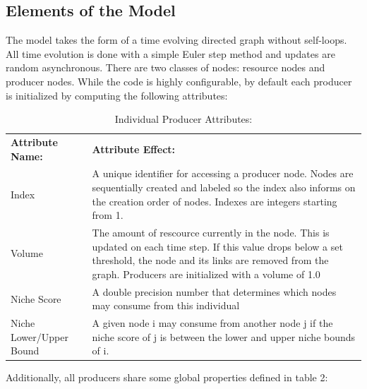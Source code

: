 \documentclass{paper}
\begin{document}
	\subsection{Elements of the Model}
	The model takes the form of a time evolving directed graph without self-loops. All time evolution is done with a simple Euler step method and updates are random asynchronous. There are two classes of nodes: resource nodes and producer nodes. While the code is highly configurable, by default each producer is initialized by computing the following attributes:
	
	\begin{table}[H]
		\begin{center}
		\caption {Individual Producer Attributes:} \label{tab:title} 
		\begin{tabular}{|p{}|p{}|}
			\cline{1-2}
			\textbf{Attribute Name:} & \textbf{Attribute Effect:}  \\ \cline{1-2}
			Index & A unique identifier for accessing a producer node. Nodes are sequentially created and labeled so the index also informs on the creation order of nodes. Indexes are integers starting from 1. \\ \cline{1-2}
			Volume & The amount of rescource currently in the node. This is updated on each time step. If this value drops below a set threshold, the node and its links are removed from the graph. Producers are initialized with a volume of 1.0  \\ \cline{1-2}
			Niche Score & A double precision number that determines which nodes may consume from this individual \\ \cline{1-2}
			Niche Lower/Upper Bound & A given node i may consume from another node j if the niche score of j is between the lower and upper niche bounds of i.\\ \cline{1-2}
			\cline{1-2}
		\end{tabular}
		\end{center}
	\end{table}

	Additionally, all producers share some global properties defined in table 2:
	
\end{document}
